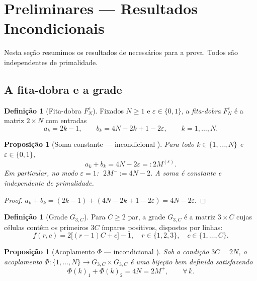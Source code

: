 \documentclass[12pt,a4paper]{article}
\newtheorem{proposition}[theorem]{Proposição}
\theoremstyle{definition}
\newtheorem{definition}[theorem]{Definição}
\newcommand{\1}[1]{\mathbf{1}_{#1}}
\begin{document}
	\section{Preliminares --- Resultados Incondicionais}
	\label{sec:prelim}
	
	Nesta seção resumimos os resultados de \cite{motor} necessários para a
	prova. Todos são independentes de primalidade.
	
	\subsection{A fita-dobra e a grade}
	
	\begin{definition}[Fita-dobra $F_N^\varepsilon$]
		\label{def:fita}
		Fixados $N \geq 1$ e $\varepsilon \in \{0,1\}$, a \emph{fita-dobra}
		$F_N^\varepsilon$ é a matriz $2 \times N$ com entradas
		\[
		a_k = 2k-1, \qquad b_k = 4N-2k+1-2\varepsilon, \qquad k = 1,\ldots,N.
		\]
	\end{definition}
	
	\begin{proposition}[Soma constante --- incondicional {\cite[Prop.~2.3]{motor}}]
		\label{prop:soma}
		Para todo $k \in \{1,\ldots,N\}$ e $\varepsilon \in \{0,1\}$,
		\[
		a_k + b_k = 4N - 2\varepsilon =: 2M^{(\varepsilon)}.
		\]
		Em particular, no modo $\varepsilon = 1$: $\;2M^- := 4N-2$.
		A soma é constante e independente de primalidade.
	\end{proposition}
	
	\begin{proof}
		$a_k + b_k = (2k-1) + (4N-2k+1-2\varepsilon) = 4N-2\varepsilon$.
	\end{proof}
	
	\begin{definition}[Grade $G_{3,C}$]
		Para $C \geq 2$ par, a grade $G_{3,C}$ é a matriz $3 \times C$ cujas
		células contêm os primeiros $3C$ ímpares positivos, dispostos por linhas:
		\[
		f(r,c) = 2\bigl[(r-1)C + c\bigr] - 1,\quad
		r \in \{1,2,3\},\quad c \in \{1,\ldots,C\}.
		\]
	\end{definition}
	
	\begin{proposition}[Acoplamento $\Phi$ --- incondicional {\cite[Prop.~3.5]{motor}}]
		\label{prop:acopl}
		Sob a condição $3C = 2N$, o acoplamento
		$\Phi : \{1,\ldots,N\} \to G_{3,C} \times G_{3,C}$
		é uma bijeção bem definida satisfazendo
		\[
		\Phi(k)_1 + \Phi(k)_2 = 4N = 2M^+, \qquad \forall\, k.
		\]
	\end{proposition}
	
\end{document}
